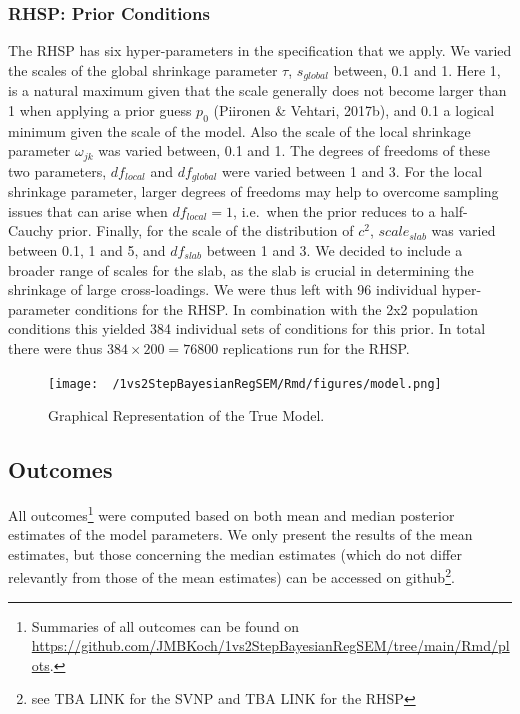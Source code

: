 \documentclass[
  man, donotrepeattitle,floatsintext]{apa6}
\begin{document}
\hypertarget{rhsp-prior-conditions}{%
\subsubsection{RHSP: Prior Conditions}\label{rhsp-prior-conditions}}

The RHSP has six hyper-parameters in the specification that we apply. We varied the scales of the global shrinkage parameter \(\tau\), \(s_{global}\) between, 0.1 and 1. Here 1, is a natural maximum given that the scale generally does not become larger than 1 when applying a prior guess \(p_0\) (Piironen \& Vehtari, 2017b), and 0.1 a logical minimum given the scale of the model. Also the scale of the local shrinkage parameter \(\omega_{jk}\) was varied between, 0.1 and 1. The degrees of freedoms of these two parameters, \(df_{local}\) and \(df_{global}\) were varied between 1 and 3. For the local shrinkage parameter, larger degrees of freedoms may help to overcome sampling issues that can arise when \(df_{local} = 1\), i.e.~when the prior reduces to a half-Cauchy prior. Finally, for the scale of the distribution of \(c^2\), \(scale_{slab}\) was varied between 0.1, 1 and 5, and \(df_{slab}\) between 1 and 3. We decided to include a broader range of scales for the slab, as the slab is crucial in determining the shrinkage of large cross-loadings. We were thus left with 96 individual hyper-parameter conditions for the RHSP. In combination with the 2x2 population conditions this yielded 384 individual sets of conditions for this prior. In total there were thus \(384 \times 200 = 76800\) replications run for the RHSP.

\begin{figure}
\centering
\texttt{[image: ~/1vs2StepBayesianRegSEM/Rmd/figures/model.png]}
\caption{Graphical Representation of the True Model.}
\end{figure}

\hypertarget{outcomes}{%
\subsection{Outcomes}\label{outcomes}}

All outcomes\footnote{Summaries of all outcomes can be found on \url{https://github.com/JMBKoch/1vs2StepBayesianRegSEM/tree/main/Rmd/plots}.} were computed based on both mean and median posterior estimates of the model parameters. We only present the results of the mean estimates, but those concerning the median estimates (which do not differ relevantly from those of the mean estimates) can be accessed on github\footnote{see TBA LINK for the SVNP and TBA LINK for the RHSP}.
\end{document}
